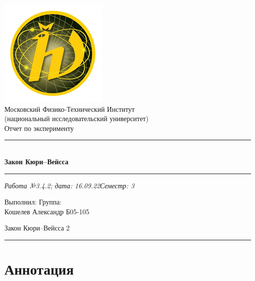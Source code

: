 \documentclass[12pt,a4paper]{scrartcl}
\begin{document}
	\begin{titlepage}
		
		\vspace*{\fill}
		
		\begin{center}
			\includegraphics[scale=0.8]{MIPT.png}
			\\[0.7cm]\Huge Московский Физико-Технический Институт\\(национальный исследовательский университет)
			\\[2cm]\LARGE Отчет по эксперименту
			\\[0.5cm]\noindent\rule{\textwidth}{1pt}
			\\\Huge\textbf{Закон Кюри–Вейсса}
			\\[-0.5cm]\noindent\rule{\textwidth}{1pt}
		\end{center}
		
		\begin{flushleft}
			\textit{Работа №3.4.2; дата: 16.09.22}\hfill\textit{Семестр: 3}
		\end{flushleft}
		
		\vspace*{\fill}
		
		\begin{flushleft}
			Выполнил: \hspace{\fill} Группа:
			\\Кошелев Александр \hspace{\fill} Б05-105
		\end{flushleft}
	\end{titlepage}
	
	
	\begin{flushleft}
		\footnotesize{Закон Кюри–Вейсса} \hspace{\fill} \footnotesize{2}
		\\[-0.3cm]\noindent\rule{\textwidth}{0.3pt}
	\end{flushleft}
	
	\section{Аннотация}
	
\end{document}
